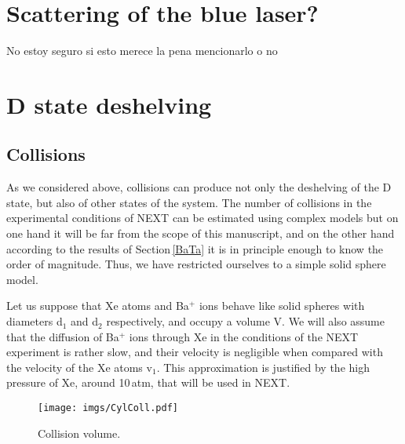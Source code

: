 \section{Scattering of the blue laser?}

No estoy seguro si esto merece la pena mencionarlo o no

\section{D state deshelving}

\subsection{Collisions}
\label{Subcol}


As we considered above, collisions can produce not only the deshelving of the D state, but also of other states of the system. The number of collisions in the experimental conditions of NEXT can be estimated using complex models but on one hand it will be far from the scope of this manuscript, and on the other hand according to the results of Section\,\ref{BaTa} it is in principle enough to know the order of magnitude. Thus, we have restricted ourselves to a simple solid sphere model.

Let us suppose that Xe atoms and Ba$^+$ ions behave like solid spheres with diameters d$_1$ and d$_2$ respectively, and occupy a volume V.  We will also assume that the diffusion of Ba$^+$ ions through Xe in the conditions of the NEXT experiment is rather slow, and their velocity is negligible when compared with the velocity of the Xe atoms v$_1$. This approximation is justified by the high pressure of Xe, around 10\,atm, that will be used in NEXT.    

 \begin{figure}[ht!]
\begin{center}
\texttt{[image: imgs/CylColl.pdf]}
\caption{\label{CylColl} Collision volume.}
\end{center}
\end{figure}

